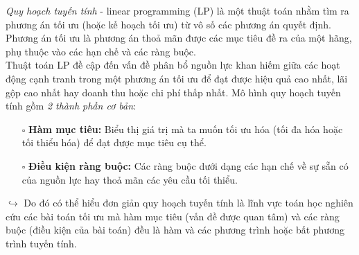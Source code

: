 \documentclass{article}
\begin{document}
\hspace{0.4cm} \textit{Quy hoạch tuyến tính} - linear programming (LP) là một thuật toán nhằm tìm ra phương án tối ưu (hoặc kế hoạch tối ưu) từ vô số các phương án quyết định. Phương án tối ưu là phương án thoả mãn được các mục tiêu đề ra của một hãng, phụ thuộc vào các hạn chế và các ràng buộc.\medskip \\ 
\indent Thuật toán LP đề cập đến vấn đề phân bổ nguồn lực khan hiếm giữa các hoạt động cạnh tranh trong một phương án tối ưu để đạt được hiệu quả cao nhất, lãi gộp cao nhất hay doanh thu hoặc chi phí thấp nhất. Mô hình quy hoạch tuyến tính gồm \textit{2 thành phần cơ bản}:\\
\begin{itemize}
    \item [$\square$] \textbf{Hàm mục tiêu:} Biểu thị giá trị mà ta muốn tối ưu hóa (tối đa hóa hoặc tối thiểu hóa) để đạt được mục tiêu cụ thể.
    \item [$\square$] \textbf{Điều kiện ràng buộc:} Các ràng buộc dưới dạng các hạn chế về sự sẵn có của nguồn lực hay thoả mãn các yêu cầu tối thiểu.
\end{itemize}
$\hookrightarrow$ Do đó có thể hiểu đơn giản quy hoạch tuyến tính là lĩnh vực toán học nghiên cứu các bài toán tối ưu mà hàm mục tiêu (vấn đề được quan tâm) và các ràng buộc (điều kiện của bài toán) đều là hàm và các phương trình hoặc bất phương trình tuyến tính.
\end{document}
